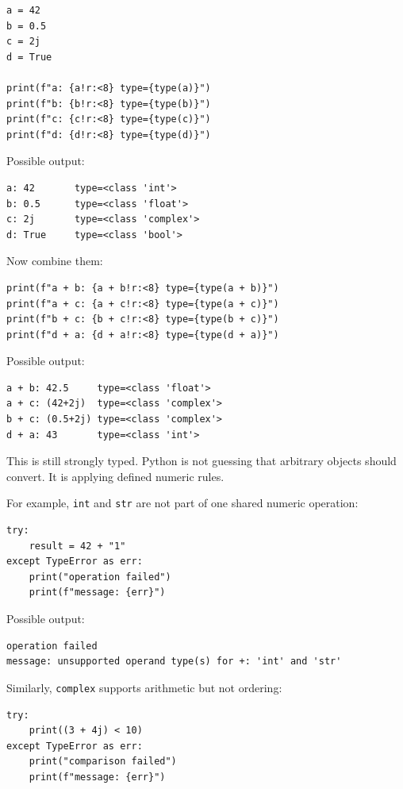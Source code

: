 \begin{verbatim}
a = 42
b = 0.5
c = 2j
d = True

print(f"a: {a!r:<8} type={type(a)}")
print(f"b: {b!r:<8} type={type(b)}")
print(f"c: {c!r:<8} type={type(c)}")
print(f"d: {d!r:<8} type={type(d)}")
\end{verbatim}

Possible output:

\begin{verbatim}
a: 42       type=<class 'int'>
b: 0.5      type=<class 'float'>
c: 2j       type=<class 'complex'>
d: True     type=<class 'bool'>
\end{verbatim}

Now combine them:

\begin{verbatim}
print(f"a + b: {a + b!r:<8} type={type(a + b)}")
print(f"a + c: {a + c!r:<8} type={type(a + c)}")
print(f"b + c: {b + c!r:<8} type={type(b + c)}")
print(f"d + a: {d + a!r:<8} type={type(d + a)}")
\end{verbatim}

Possible output:

\begin{verbatim}
a + b: 42.5     type=<class 'float'>
a + c: (42+2j)  type=<class 'complex'>
b + c: (0.5+2j) type=<class 'complex'>
d + a: 43       type=<class 'int'>
\end{verbatim}

This is still strongly typed. Python is not guessing that arbitrary objects should convert. It is applying defined numeric rules.

For example, \texttt{int} and \texttt{str} are not part of one shared numeric operation:

\begin{verbatim}
try:
    result = 42 + "1"
except TypeError as err:
    print("operation failed")
    print(f"message: {err}")
\end{verbatim}

Possible output:

\begin{verbatim}
operation failed
message: unsupported operand type(s) for +: 'int' and 'str'
\end{verbatim}

Similarly, \texttt{complex} supports arithmetic but not ordering:

\begin{verbatim}
try:
    print((3 + 4j) < 10)
except TypeError as err:
    print("comparison failed")
    print(f"message: {err}")
\end{verbatim}


